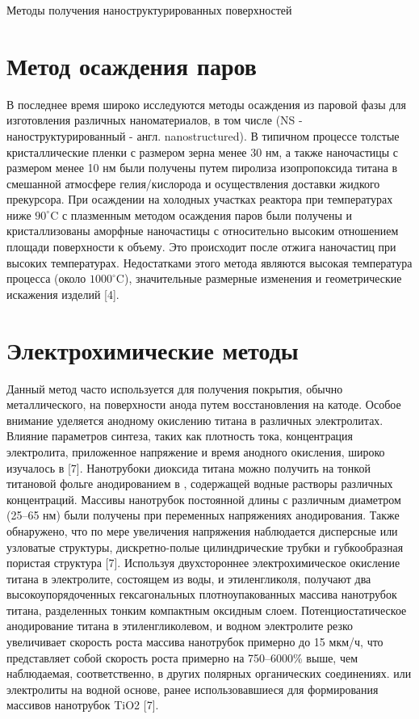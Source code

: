 \documentclass[oneside,final,12pt]{extreport}
\begin{document}
\begin{chapter} {Методы получения наноструктурированных поверхностей }
\section{Метод осаждения паров}
В последнее время широко исследуются методы осаждения из паровой фазы для изготовления различных наноматериалов, в том числе  (NS - наноструктурированный - англ. nanostructured). В типичном процессе толстые кристаллические пленки  с размером зерна менее 30 нм, а также наночастицы  с размером менее 10 нм были получены путем пиролиза изопропоксида титана в смешанной атмосфере гелия/кислорода и осуществления доставки жидкого прекурсора. При осаждении на холодных участках реактора при температурах ниже $90^{\circ}$C с плазменным методом осаждения паров были получены и кристаллизованы аморфные наночастицы  с относительно высоким отношением площади поверхности к объему. Это происходит после отжига наночастиц при высоких температурах. Недостатками этого метода являются высокая температура процесса (около $1000^{\circ}$C), значительные размерные изменения и геометрические искажения изделий [4].

\section{Электрохимические методы}

Данный метод часто используется для получения покрытия, обычно металлического, на поверхности анода путем восстановления на катоде. Особое внимание уделяется анодному окислению титана в различных электролитах. Влияние параметров синтеза, таких как плотность тока, концентрация электролита, приложенное напряжение и время анодного окисления, широко изучалось в [7]. Нанотрубоки диоксида титана можно получить на тонкой титановой фольге анодированием в , содержащей водные растворы различных концентраций. Массивы нанотрубок постоянной длины с различным диаметром (25–65 нм) были получены при переменных напряжениях анодирования. Также обнаружено, что по мере увеличения напряжения наблюдается дисперсные или узловатые структуры, дискретно-полые цилиндрические трубки и губкообразная пористая структура [7]. Используя двухстороннее электрохимическое окисление титана в электролите, состоящем из воды,  и этиленгликоля, получают два высокоупорядоченных гексагональных плотноупакованных массива нанотрубок титана, разделенных тонким компактным оксидным слоем. Потенциостатическое анодирование титана в этиленгликолевом,  и водном электролите резко увеличивает скорость роста массива нанотрубок примерно до 15 мкм/ч, что представляет собой скорость роста примерно на 750–6000\% выше, чем наблюдаемая, соответственно, в других полярных органических соединениях. или электролиты на водной основе, ранее использовавшиеся для формирования массивов нанотрубок TiO2 [7].
\end{chapter}
\end{document}
